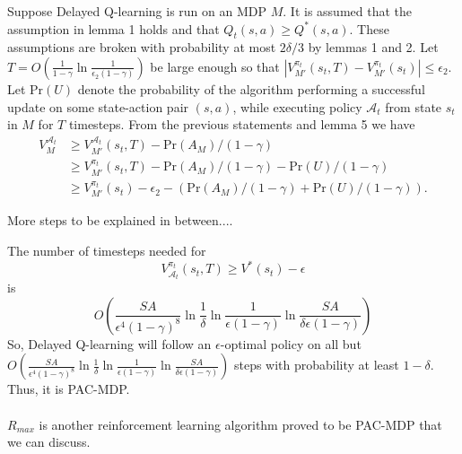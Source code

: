 \documentclass[10pt]{article}
\begin{document}
Suppose Delayed Q-learning is run on an MDP $M$. It is assumed that the assumption in lemma 1 holds and that $Q_t(s,a) \geq Q^*(s,a)$.  These assumptions are broken with probability at most $2\delta/3$ by lemmas 1 and 2.  
Let $T=O\left(\frac{1}{1-\gamma}\ln{\frac{1}{\epsilon_2(1-\gamma)}}\right)$ be large enough so that $|V_{M'}^{\pi_t}(s_t,T) - V_{M'}^{\pi_t}(s_t)| \leq \epsilon_2$.   Let $\text{Pr}(U)$ denote the probability of
the algorithm performing a successful update on some
state-action pair $(s, a)$, while executing policy
$\mathcal{A}_t$ from state $s_t$ in $M$ for $T$ timesteps. From the previous statements and lemma 5 we have 
\begin{align*}
V_M^{\mathcal{A}_t} & \geq V_{M'}^{\mathcal{A}_t}(s_t,T)-\text{Pr}(A_M)/(1-\gamma) \\
 & \geq V_{M'}^{\pi_t}(s_t,T)-\text{Pr}(A_M)/(1-\gamma) -\text{Pr}(U)/(1-\gamma) \\
 & \geq V_{M'}^{\pi_t}(s_t)-\epsilon_2-(\text{Pr}(A_M)/(1-\gamma) +\text{Pr}(U)/(1-\gamma)). 
\end{align*}



More steps to be explained in between....

The number of timesteps needed for 
$$V_{\mathcal{A}_t}^{\pi_t}(s_t,T) \geq V^*(s_t)-\epsilon$$
is 
$$O\left(\frac{SA}{\epsilon^4(1-\gamma)^8}\ln{\frac{1}{\delta}}\ln{\frac{1}{\epsilon(1-\gamma)}}\ln{\frac{SA}{\delta\epsilon(1-\gamma)}}\right)$$
So, Delayed Q-learning will follow an $\epsilon$-optimal policy on all but $O\left(\frac{SA}{\epsilon^4(1-\gamma)^8}\ln{\frac{1}{\delta}}\ln{\frac{1}{\epsilon(1-\gamma)}}\ln{\frac{SA}{\delta\epsilon(1-\gamma)}}\right)$ steps with probability at least $1-\delta$.  Thus, it is PAC-MDP.
\\ 
\\
$R_{max}$ is another reinforcement learning algorithm proved to be PAC-MDP that we can discuss.

\nocite{yang_multiagent_2004}
\nocite{kim_autonomous_2003}
\nocite{mohri_foundations_2012}

\newpage
{}





\end{document}
